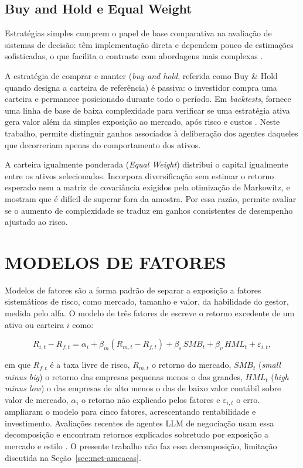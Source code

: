 \subsection{Buy and Hold e Equal Weight}

Estratégias simples cumprem o papel de base comparativa na avaliação de sistemas de decisão: têm implementação direta e dependem pouco de estimações sofisticadas, o que facilita o contraste com abordagens mais complexas \citep{DeMiguel2009, LopezDePrado2018}.

A estratégia de comprar e manter (\textit{buy and hold}, referida como Buy \& Hold quando designa a carteira de referência) é passiva: o investidor compra uma carteira e permanece posicionado durante todo o período. Em \textit{backtests}, fornece uma linha de base de baixa complexidade para verificar se uma estratégia ativa gera valor além da simples exposição ao mercado, após risco e custos \citep{LopezDePrado2018}. Neste trabalho, permite distinguir ganhos associados à deliberação dos agentes daqueles que decorreriam apenas do comportamento dos ativos.

A carteira igualmente ponderada (\textit{Equal Weight}) distribui o capital igualmente entre os ativos selecionados. Incorpora diversificação sem estimar o retorno esperado nem a matriz de covariância exigidos pela otimização de Markowitz, e \citet{DeMiguel2009} mostram que é difícil de superar fora da amostra. Por essa razão, permite avaliar se o aumento de complexidade se traduz em ganhos consistentes de desempenho ajustado ao risco.

\section{MODELOS DE FATORES}

Modelos de fatores são a forma padrão de separar a exposição a fatores sistemáticos de risco, como mercado, tamanho e valor, da habilidade do gestor, medida pelo alfa. O modelo de três fatores de \citet{FamaFrench1993} escreve o retorno excedente de um ativo ou carteira $i$ como:

\begin{equation}
R_{i,t} - R_{f,t} = \alpha_i + \beta_m (R_{m,t} - R_{f,t}) + \beta_s\, \mathit{SMB}_t + \beta_v\, \mathit{HML}_t + \varepsilon_{i,t},
\end{equation}

\noindent em que $R_{f,t}$ é a taxa livre de risco, $R_{m,t}$ o retorno do mercado, $\mathit{SMB}_t$ (\textit{small minus big}) o retorno das empresas pequenas menos o das grandes, $\mathit{HML}_t$ (\textit{high minus low}) o das empresas de alto menos o das de baixo valor contábil sobre valor de mercado, $\alpha_i$ o retorno não explicado pelos fatores e $\varepsilon_{i,t}$ o erro. \citet{FamaFrench2015} ampliaram o modelo para cinco fatores, acrescentando rentabilidade e investimento. Avaliações recentes de agentes LLM de negociação usam essa decomposição e encontram retornos explicados sobretudo por exposição a mercado e estilo \citep{Wang2026beta}. O presente trabalho não faz essa decomposição, limitação discutida na Seção~\ref{sec:met-ameacas}.

